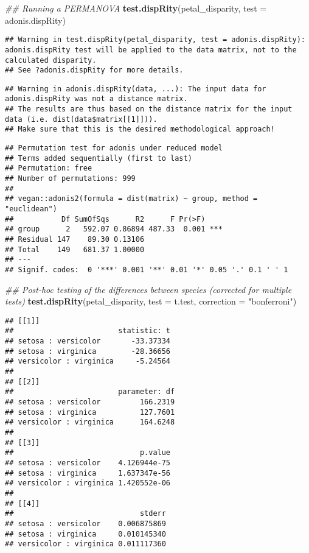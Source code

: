 \documentclass[
]{book}
\newenvironment{Shaded}{\begin{snugshade}}{\end{snugshade}}
\newcommand{\CommentTok}[1]{\textcolor[rgb]{0.56,0.35,0.01}{\textit{#1}}}
\newcommand{\DataTypeTok}[1]{\textcolor[rgb]{0.13,0.29,0.53}{#1}}
\newcommand{\KeywordTok}[1]{\textcolor[rgb]{0.13,0.29,0.53}{\textbf{#1}}}
\newcommand{\NormalTok}[1]{#1}
\newcommand{\StringTok}[1]{\textcolor[rgb]{0.31,0.60,0.02}{#1}}
\begin{document}
\begin{Shaded}
\begin{Highlighting}[]
\CommentTok{\#\# Running a PERMANOVA}
\KeywordTok{test.dispRity}\NormalTok{(petal\_disparity, }\DataTypeTok{test =}\NormalTok{ adonis.dispRity)}
\end{Highlighting}
\end{Shaded}

\begin{verbatim}
## Warning in test.dispRity(petal_disparity, test = adonis.dispRity): adonis.dispRity test will be applied to the data matrix, not to the calculated disparity.
## See ?adonis.dispRity for more details.
\end{verbatim}

\begin{verbatim}
## Warning in adonis.dispRity(data, ...): The input data for adonis.dispRity was not a distance matrix.
## The results are thus based on the distance matrix for the input data (i.e. dist(data$matrix[[1]])).
## Make sure that this is the desired methodological approach!
\end{verbatim}

\begin{verbatim}
## Permutation test for adonis under reduced model
## Terms added sequentially (first to last)
## Permutation: free
## Number of permutations: 999
## 
## vegan::adonis2(formula = dist(matrix) ~ group, method = "euclidean")
##           Df SumOfSqs      R2      F Pr(>F)    
## group      2   592.07 0.86894 487.33  0.001 ***
## Residual 147    89.30 0.13106                  
## Total    149   681.37 1.00000                  
## ---
## Signif. codes:  0 '***' 0.001 '**' 0.01 '*' 0.05 '.' 0.1 ' ' 1
\end{verbatim}

\begin{Shaded}
\begin{Highlighting}[]
\CommentTok{\#\# Post{-}hoc testing of the differences between species (corrected for multiple tests)}
\KeywordTok{test.dispRity}\NormalTok{(petal\_disparity, }\DataTypeTok{test =}\NormalTok{ t.test, }\DataTypeTok{correction =} \StringTok{"bonferroni"}\NormalTok{)}
\end{Highlighting}
\end{Shaded}

\begin{verbatim}
## [[1]]
##                        statistic: t
## setosa : versicolor       -33.37334
## setosa : virginica        -28.36656
## versicolor : virginica     -5.24564
## 
## [[2]]
##                        parameter: df
## setosa : versicolor         166.2319
## setosa : virginica          127.7601
## versicolor : virginica      164.6248
## 
## [[3]]
##                             p.value
## setosa : versicolor    4.126944e-75
## setosa : virginica     1.637347e-56
## versicolor : virginica 1.420552e-06
## 
## [[4]]
##                             stderr
## setosa : versicolor    0.006875869
## setosa : virginica     0.010145340
## versicolor : virginica 0.011117360
\end{verbatim}
\end{document}
